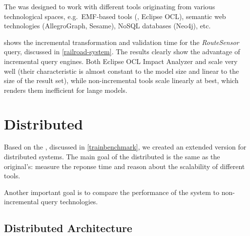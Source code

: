 The \tb{} was designed to work with different tools originating from various technological spaces, e.g.\ EMF-based tools (\eiq{}, Eclipse OCL), semantic web technologies (AllegroGraph, Sesame), NoSQL databases (Neo4j), etc.


 shows the incremental transformation and validation time for the \emph{RouteSensor} query, discussed in \autoref{railroad-system}. The results clearly show the advantage of incremental query engines. Both Eclipse OCL Impact Analyzer and \eiq{} scale very well (their characteristic is almost constant to the model size and linear to the size of the result set), while non-incremental tools scale linearly at best, which renders them inefficient for lange models.



\section{Distributed \tb{}}
\label{distributed-trainbenchmark}


Based on the \tb{}, discussed in \autoref{trainbenchmark}, we created an extended version for distributed systems. The main goal of the distributed \tb{} is the same as the original's: measure the reponse time and reason about the scalability of different tools.

Another important goal is to compare the performance of the system to non-incremental query technologies.

\subsection{Distributed Architecture}

